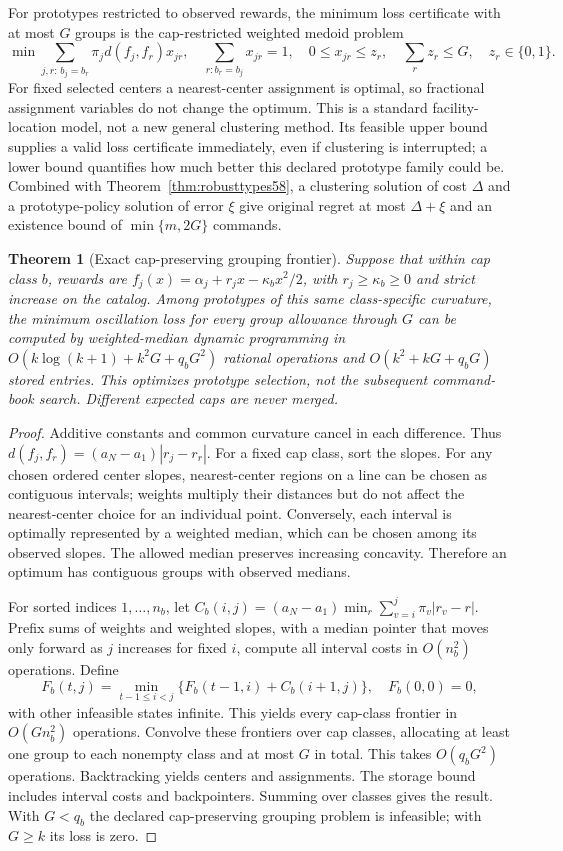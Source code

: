 \documentclass[11pt,letterpaper]{article}
\newtheorem{theorem}{Theorem}[section]
\theoremstyle{definition}\newtheorem{remark}[theorem]{Remark}
\begin{document}
For prototypes restricted to observed rewards, the minimum loss certificate with at most $G$ groups is the cap-restricted weighted medoid problem
\[
 \min\sum_{j,r:\,b_j=b_r}\pi_jd(f_j,f_r)x_{jr},\quad
 \sum_{r:b_r=b_j}x_{jr}=1,\quad 0\leq x_{jr}\leq z_r,\quad
 \sum_r z_r\leq G,\quad z_r\in\{0,1\}.
\]
For fixed selected centers a nearest-center assignment is optimal, so fractional assignment variables do not change the optimum. This is a standard facility-location model, not a new general clustering method. Its feasible upper bound supplies a valid loss certificate immediately, even if clustering is interrupted; a lower bound quantifies how much better this declared prototype family could be. Combined with Theorem~\ref{thm:robusttypes58}, a clustering solution of cost $\Delta$ and a prototype-policy solution of error $\xi$ give original regret at most $\Delta+\xi$ and an existence bound of $\min\{m,2G\}$ commands.

\begin{theorem}[Exact cap-preserving grouping frontier]\label{thm:grouping59}
Suppose that within cap class $b$, rewards are $f_j(x)=\alpha_j+r_jx-\kappa_b x^2/2$, with $r_j\geq\kappa_b\geq0$ and strict increase on the catalog. Among prototypes of this same class-specific curvature, the minimum oscillation loss for every group allowance through $G$ can be computed by weighted-median dynamic programming in
$O(k\log(k+1)+k^2G+q_bG^2)$ rational operations and $O(k^2+kG+q_bG)$ stored entries. This optimizes prototype selection, not the subsequent command-book search. Different expected caps are never merged.
\end{theorem}
\begin{proof}
Additive constants and common curvature cancel in each difference. Thus $d(f_j,f_r)=(a_N-a_1)|r_j-r_r|$. For a fixed cap class, sort the slopes. For any chosen ordered center slopes, nearest-center regions on a line can be chosen as contiguous intervals; weights multiply their distances but do not affect the nearest-center choice for an individual point. Conversely, each interval is optimally represented by a weighted median, which can be chosen among its observed slopes. The allowed median preserves increasing concavity. Therefore an optimum has contiguous groups with observed medians.

For sorted indices $1,\ldots,n_b$, let
$C_b(i,j)=(a_N-a_1)\min_r\sum_{v=i}^j\pi_v|r_v-r|$.
Prefix sums of weights and weighted slopes, with a median pointer that moves only forward as $j$ increases for fixed $i$, compute all interval costs in $O(n_b^2)$ operations. Define
\[
 F_b(t,j)=\min_{t-1\leq i<j}\{F_b(t-1,i)+C_b(i+1,j)\},
 \quad F_b(0,0)=0,
\]
with other infeasible states infinite. This yields every cap-class frontier in $O(Gn_b^2)$ operations. Convolve these frontiers over cap classes, allocating at least one group to each nonempty class and at most $G$ in total. This takes $O(q_bG^2)$ operations. Backtracking yields centers and assignments. The storage bound includes interval costs and backpointers. Summing over classes gives the result. With $G<q_b$ the declared cap-preserving grouping problem is infeasible; with $G\geq k$ its loss is zero.
\end{proof}
\end{document}
